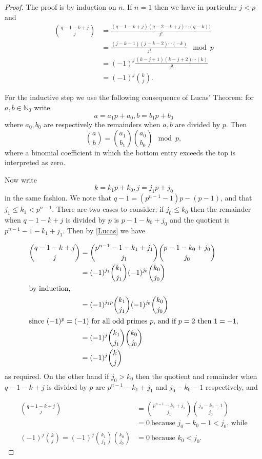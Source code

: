 \documentclass[a4paper]{amsart}
\def\N{\mathbb{N}}
\theoremstyle{definition}
\theoremstyle{remark}
\theoremstyle{Acknowledgments}
\begin{document}
\begin{proof} 
The proof is by induction on $n$. If $n=1$ then we have in particular $j<p$ and
\begin{align*}
\binom{q-1-k+j}{j}  &= \frac{(q-1-k+j)(q-2-k+j) \cdots (q-k))}{j!}\\
				&=  \frac{(j-k-1)(j-k-2) \cdots (-k)}{j!} \mod p\\
				&= (-1)^j  \frac{(k-j+1)(k-j+2) \cdots (k)}{j!}\\
				&= (-1)^j\binom{k}{j}.
\end{align*} 

For the inductive step we use the following consequence of Lucas' Theorem: for $a,b \in \N_0$ write 
\[a=a_1 p + a_0, b= b_1p +b_0\]
 where $a_0, b_0$ are respectively the remainders when $a,b$ are divided by $p$. Then
\begin{equation}\label{Lucas} \binom{a}{b} = \binom{a_1}{b_1} \binom{a_0}{b_0} \mod p,\end{equation} where a binomial coefficient in which the bottom entry exceeds the top is interpreted as zero.

Now write
\[k= k_1 p + k_0, j = j_1p + j_0\] in the same fashion. We note that $q-1 = (p^{n-1}-1)p - (p-1)$, and that $j_1 \leq k_1<p^{n-1}$. There are two cases to consider: if $j_0 \leq k_0$ then the remainder when $q-1-k+j$ is divided by $p$ is $p-1-k_0+j_0$ and the quotient is $p^{n-1}-1-k_1+j_1$. Then by \eqref{Lucas} we have

\begin{align*}
\binom{q-1-k+j}{j} &= \binom{p^{n-1}-1-k_1+j_1}{j_1}  \binom{p-1-k_0+j_0}{j_0}\\
&=   (-1)^{j_1}\binom{k_1}{j_1} (-1)^{j_0} \binom{k_0}{j_0}\\
\intertext{by induction,}
&=   (-1)^{j_1p}\binom{k_1}{j_1} (-1)^{j_0} \binom{k_0}{j_0}\\
\intertext{since $(-1)^p = (-1)$ for all odd primes $p$, and if $p=2$ then $1=-1$,}
&=   (-1)^{j}\binom{k_1}{j_1} \binom{k_0}{j_0}\\
&=   (-1)^{j}\binom{k}{j} \\
\end{align*} as required. On the other hand if $j_0>k_0$ then the quotient and remainder when $q-1-k+j$ is divided by $p$ are $p^{n-1}-k_1+j_1$ and $j_0-k_0-1$ respectively, and 

\begin{align*}
\binom{q-1-k+j}{j} &= \binom{p^{n-1}-k_1+j_1}{j_1}  \binom{j_0-k_0-1}{j_0}\\
&=0 \ \text{because $j_0-k_0-1<j_0$, while}\\
(-1)^j \binom{k}{j} = (-1)^j  \binom{k_1}{j_1} \binom{k_0}{j_0}
&= 0 \ \text{because $k_0<j_0$.}
\end{align*}
\end{proof}
\end{document}
